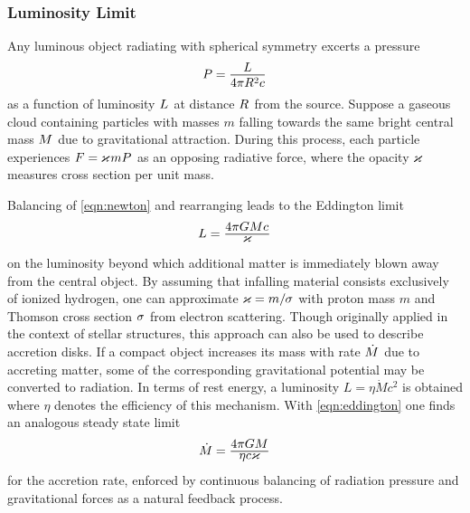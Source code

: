 \subsubsection*{Luminosity Limit}

Any luminous object radiating with spherical symmetry excerts a pressure
\begin{equation*}
	P = \frac{\raisebox{-0.3ex}{$L$}}{4\pi R^2 c}
\end{equation*}
as a function of luminosity $L \kern+0.5pt$ at distance $R \kern+0.5pt$ from the source.
Suppose a gaseous cloud containing particles with masses $m$ falling towards the same bright central mass $M \kern+0.5pt$
due to gravitational attraction. During this process, each particle experiences $F = \kern-0.3pt \varkappa \kern+0.7pt mP \kern+0.5pt$
as an opposing radiative force, where the opacity $\kern-0.3pt \varkappa \kern+0.7pt$ measures cross section per unit mass.

\newpage Balancing of \eqref{eqn:newton} and rearranging leads to the Eddington limit
\begin{equation}
	L = \frac{\raisebox{-0.3ex}{$4\pi GM c \kern+0.4pt$}}{\raisebox{0.8ex}{$\varkappa$}}
	\label{eqn:eddington}
\end{equation}
on the luminosity beyond which additional matter is immediately blown away from the central object. By assuming that infalling
material consists exclusively of ionized hydrogen, one can approximate $\varkappa \kern-0.1pt = m / \kern-0.5pt \sigma \kern+0.3pt$
with proton mass $m$ and Thomson cross section $\sigma \kern+0.5pt$ from electron scattering. Though originally applied in the
context of stellar structures, this approach can also be used to describe accretion disks. If a compact object increases its mass
with rate $\dot{M} \kern+0.5pt$ due to accreting matter, some of the corresponding gravitational potential may be converted to
radiation. In terms of rest energy, a luminosity $L = \eta\dot{M}c^2$ is obtained where $\eta$ denotes the efficiency of this
mechanism. With \eqref{eqn:eddington} one finds an analogous steady state limit
\begin{equation*}
	\dot{M} \kern-0.2pt = \frac{\raisebox{-0.3ex}{$4\pi GM$}}{\raisebox{0.8ex}{$\eta c \varkappa$}}
\end{equation*}
for the accretion rate, enforced by continuous balancing of radiation pressure and gravitational forces as a natural feedback process.
